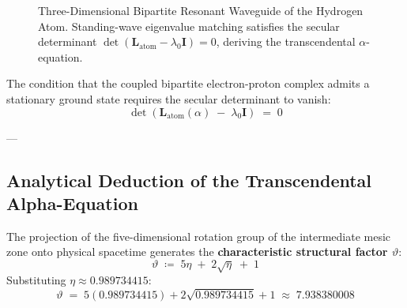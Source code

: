 \documentclass[
    12pt,
    a4paper,
    headings=normal,
    twoside=false,
    open=any,
    parskip=half
]{scrbook}
\begin{document}
\begin{figure}[htbp]
\caption{Three-Dimensional Bipartite Resonant Waveguide of the Hydrogen Atom. Standing-wave eigenvalue matching satisfies the secular determinant $\det(\mathbf{L}_{\text{atom}} - \lambda_0 \mathbf{I}) = 0$, deriving the transcendental $\alpha$-equation.}
\label{fig:ch5_hydrogen_resonance_3d}
\end{figure}

The condition that the coupled bipartite electron-proton complex admits a stationary ground state requires the secular determinant to vanish:
\begin{equation}
\det\left( \mathbf{L}_{\text{atom}}(\alpha) \;-\; \lambda_0 \mathbf{I} \right) \;=\; 0
\label{eq:ch5_secular_determinant_cond}
\end{equation}

---

\subsection{Analytical Deduction of the Transcendental Alpha-Equation}

The projection of the five-dimensional rotation group of the intermediate mesic zone onto physical spacetime generates the \textbf{characteristic structural factor $\vartheta$}:
\begin{equation}
\vartheta \;\coloneqq\; 5\eta \;+\; 2\sqrt{\eta} \;+\; 1
\label{eq:ch5_theta_def}
\end{equation}
Substituting $\eta \approx 0.989734415$:
\begin{equation}
\vartheta \;=\; 5(0.989734415) + 2\sqrt{0.989734415} + 1 \;\approx\; \mathbf{7.938380008}
\label{eq:ch5_theta_val}
\end{equation}
\end{document}
